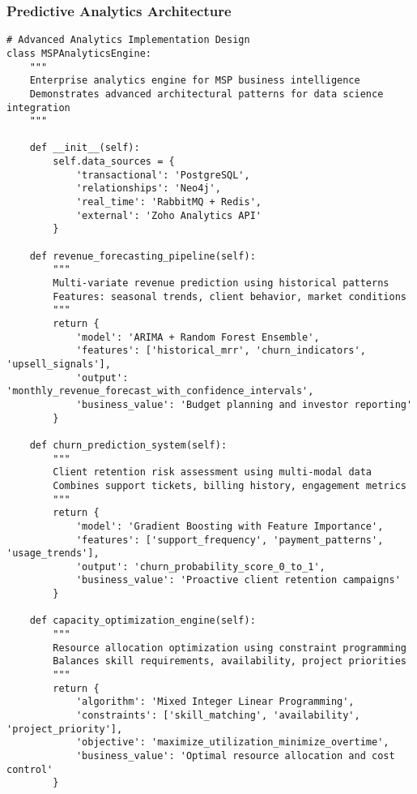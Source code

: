 \subsubsection{Predictive Analytics Architecture}
\begin{verbatim}
# Advanced Analytics Implementation Design
class MSPAnalyticsEngine:
    """
    Enterprise analytics engine for MSP business intelligence
    Demonstrates advanced architectural patterns for data science integration
    """
    
    def __init__(self):
        self.data_sources = {
            'transactional': 'PostgreSQL',
            'relationships': 'Neo4j', 
            'real_time': 'RabbitMQ + Redis',
            'external': 'Zoho Analytics API'
        }
        
    def revenue_forecasting_pipeline(self):
        """
        Multi-variate revenue prediction using historical patterns
        Features: seasonal trends, client behavior, market conditions
        """
        return {
            'model': 'ARIMA + Random Forest Ensemble',
            'features': ['historical_mrr', 'churn_indicators', 'upsell_signals'],
            'output': 'monthly_revenue_forecast_with_confidence_intervals',
            'business_value': 'Budget planning and investor reporting'
        }
    
    def churn_prediction_system(self):
        """
        Client retention risk assessment using multi-modal data
        Combines support tickets, billing history, engagement metrics
        """
        return {
            'model': 'Gradient Boosting with Feature Importance',
            'features': ['support_frequency', 'payment_patterns', 'usage_trends'],
            'output': 'churn_probability_score_0_to_1',
            'business_value': 'Proactive client retention campaigns'
        }
    
    def capacity_optimization_engine(self):
        """
        Resource allocation optimization using constraint programming
        Balances skill requirements, availability, project priorities
        """
        return {
            'algorithm': 'Mixed Integer Linear Programming',
            'constraints': ['skill_matching', 'availability', 'project_priority'],
            'objective': 'maximize_utilization_minimize_overtime',
            'business_value': 'Optimal resource allocation and cost control'
        }
\end{verbatim}

